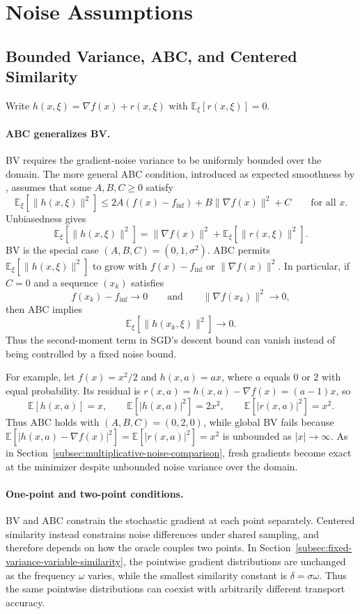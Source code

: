 \section{Noise Assumptions}
\label{app:noise-assumptions}

\subsection{Bounded Variance, ABC, and Centered Similarity}
\label{subsec:comparing-assumptions}

Write $h(x,\xi)=\nabla f(x)+r(x,\xi)$ with
$\mathbb E_\xi[r(x,\xi)]=0$.

\paragraph{ABC generalizes BV.}
BV requires the gradient-noise variance to be uniformly bounded over
the domain. The more general ABC condition, introduced as expected
smoothness by \citet{khaled2023better}, assumes that some
$A,B,C\geq0$ satisfy
\begin{equation}
\label{eq:abc-assumption}
\mathbb E_\xi[\|h(x,\xi)\|^2]
\leq2A(f(x)-f_{\inf})+B\|\nabla f(x)\|^2+C
\qquad\text{for all }x.
\end{equation}
Unbiasedness gives
\[
\mathbb E_\xi[\|h(x,\xi)\|^2]
=\|\nabla f(x)\|^2+\mathbb E_\xi[\|r(x,\xi)\|^2].
\]
BV is the special case $(A,B,C)=(0,1,\sigma^2)$.
ABC permits $\mathbb E_\xi[\|h(x,\xi)\|^2]$ to grow with
$f(x)-f_{\inf}$ or $\|\nabla f(x)\|^2$.
In particular, if $C=0$ and a sequence $(x_k)$ satisfies
\[
f(x_k)-f_{\inf}\to0
\qquad\text{and}\qquad
\|\nabla f(x_k)\|^2\to0,
\]
then ABC implies
\[
\mathbb E_\xi[\|h(x_k,\xi)\|^2]\to0.
\]
Thus the second-moment term in SGD's descent bound can vanish
instead of being controlled by a fixed noise bound.

For example, let $f(x)=x^2/2$ and $h(x,a)=ax$, where $a$ equals
$0$ or $2$ with equal probability. Its residual is
$r(x,a)=h(x,a)-\nabla f(x)=(a-1)x$, so
\[
\mathbb E[h(x,a)]=x,\qquad
\mathbb E[|h(x,a)|^2]=2x^2,\qquad
\mathbb E[|r(x,a)|^2]=x^2.
\]
Thus ABC holds with $(A,B,C)=(0,2,0)$, while global BV fails
because $\mathbb E[|h(x,a)-\nabla f(x)|^2]=\mathbb E[|r(x,a)|^2]=x^2$ is unbounded as $|x|\to\infty$.
As in Section~\ref{subsec:multiplicative-noise-comparison}, fresh
gradients become exact at the minimizer despite unbounded noise
variance over the domain.

\paragraph{One-point and two-point conditions.}
BV and ABC constrain the stochastic gradient at each point separately.
Centered similarity instead constrains noise differences under shared
sampling, and therefore depends on how the oracle couples two points.
In Section~\ref{subsec:fixed-variance-variable-similarity}, the
pointwise gradient distributions are unchanged as the frequency
$\omega$ varies, while the smallest similarity constant is
$\delta=\sigma\omega$. Thus the same pointwise distributions can
coexist with arbitrarily different transport accuracy.

